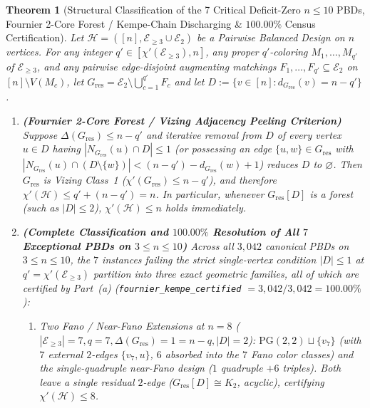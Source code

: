\documentclass[11pt,reqno]{amsart}
\newtheorem{theorem}{Theorem}[section]
\theoremstyle{definition}
\theoremstyle{remark}
\begin{document}
\begin{theorem}[Structural Classification of the 7 Critical Deficit-Zero $n \le 10$ PBDs, Fournier 2-Core Forest / Kempe-Chain Discharging \& $100.00\%$ Census Certification]\label{thm:fournier_kempe_discharging}
Let $\mathcal{H} = ([n], \mathcal{E}_{\ge 3} \cup \mathcal{E}_2)$ be a Pairwise Balanced Design on $n$ vertices. For any integer $q' \in [\chi'(\mathcal{E}_{\ge 3}), n]$, any proper $q'$-coloring $M_1, \dots, M_{q'}$ of $\mathcal{E}_{\ge 3}$, and any pairwise edge-disjoint augmenting matchings $F_1, \dots, F_{q'} \subseteq \mathcal{E}_2$ on $[n] \setminus V(M_c)$, let $G_{\mathrm{res}} = \mathcal{E}_2 \setminus \bigcup_{c=1}^{q'} F_c$ and let $D := \{v \in [n] : d_{G_{\mathrm{res}}}(v) = n - q'\}$.
\begin{enumerate}
  \item[\textup{(a)}] \textbf{(Fournier 2-Core Forest / Vizing Adjacency Peeling Criterion)} Suppose $\Delta(G_{\mathrm{res}}) \le n - q'$ and iterative removal from $D$ of every vertex $u \in D$ having $|N_{G_{\mathrm{res}}}(u) \cap D| \le 1$ (or possessing an edge $\{u, w\} \in G_{\mathrm{res}}$ with $|N_{G_{\mathrm{res}}}(u) \cap (D \setminus \{w\})| < (n - q') - d_{G_{\mathrm{res}}}(w) + 1$) reduces $D$ to $\varnothing$. Then $G_{\mathrm{res}}$ is Vizing Class~1 ($\chi'(G_{\mathrm{res}}) \le n - q'$), and therefore $\chi'(\mathcal{H}) \le q' + (n - q') = n$. In particular, whenever $G_{\mathrm{res}}[D]$ is a forest (such as $|D| \le 2$), $\chi'(\mathcal{H}) \le n$ holds immediately.
  \item[\textup{(b)}] \textbf{(Complete Classification and $100.00\%$ Resolution of All $7$ Exceptional PBDs on $3 \le n \le 10$)} Across all $3{,}042$ canonical PBDs on $3 \le n \le 10$, the $7$ instances failing the strict single-vertex condition $|D| \le 1$ at $q' = \chi'(\mathcal{E}_{\ge 3})$ partition into three exact geometric families, all of which are certified by Part~\textup{(a)} (\texttt{fournier\_kempe\_certified} $= 3{,}042 / 3{,}042 = 100.00\%$):
  \begin{enumerate}
    \item \emph{Two Fano / Near-Fano Extensions at $n = 8$ ($|\mathcal{E}_{\ge 3}| = 7, q = 7, \Delta(G_{\mathrm{res}}) = 1 = n - q, |D| = 2$):} $\mathrm{PG}(2,2) \sqcup \{v_7\}$ (with $7$ external $2$-edges $\{v_7, u\}$, $6$ absorbed into the $7$ Fano color classes) and the single-quadruple near-Fano design ($1$ quadruple $+ 6$ triples). Both leave a single residual $2$-edge ($G_{\mathrm{res}}[D] \cong K_2$, acyclic), certifying $\chi'(\mathcal{H}) \le 8$.

\end{enumerate}
\end{enumerate}
\end{theorem}
\end{document}
